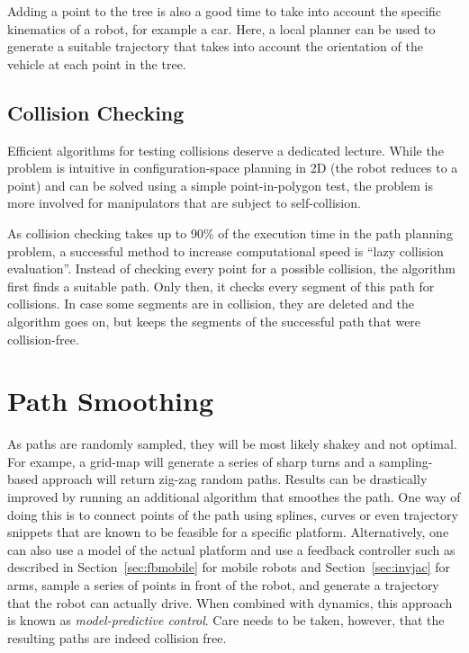 Adding a point to the tree is also a good time to take into account the specific kinematics of a robot, for example a car. Here, a local planner can be used to generate a suitable trajectory that takes into account the orientation of the vehicle at each point in the tree.

\subsection{Collision Checking}
Efficient algorithms for testing collisions deserve a dedicated lecture. While the problem is intuitive in configuration-space planning in 2D (the robot reduces to a point) and can be solved using a simple point-in-polygon test, the problem is more involved for manipulators that are subject to self-collision.

As collision checking takes up to 90\% of the execution time in the path planning problem, a successful method to increase computational speed is ``lazy collision evaluation''. Instead of checking every point for a possible collision, the algorithm first finds a suitable path. Only then, it checks every segment of this path for collisions. In case some segments are in collision, they are deleted and the algorithm goes on, but keeps the segments of the successful path that were collision-free.

\section{Path Smoothing}
As paths are randomly sampled, they will be most likely shakey and not optimal. For exampe, a grid-map will generate a series of sharp turns and a sampling-based approach will return zig-zag random paths. Results can be drastically improved by running an additional algorithm that smoothes the path. One way of doing this is to connect points of the path using splines, curves or even trajectory snippets that are known to be feasible for a specific platform. Alternatively, one can also use a model of the actual platform and use a feedback controller such as described in Section~\ref{sec:fbmobile} for mobile robots and Section~\ref{sec:invjac} for arms, sample a series of points in front of the robot, and generate a trajectory that the robot can actually drive. When combined with dynamics, this approach is known as \emph{model-predictive control}. Care needs to be taken, however, that the resulting paths are indeed collision free.

